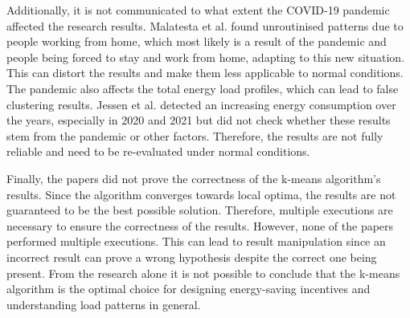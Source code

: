 Additionally, it is not communicated to what extent the COVID-19 pandemic affected the research results.
Malatesta et al. \cite{MAL-HBP} found unroutinised patterns due to people working from home, which most likely is a result of the pandemic and people being forced to stay and work from home, adapting to this new situation.
This can distort the results and make them less applicable to normal conditions.
The pandemic also affects the total energy load profiles, which can lead to false clustering results.
Jessen et al. \cite{JES-IND} detected an increasing energy consumption over the years, especially in 2020 and 2021 but did not check whether these results stem from the pandemic or other factors.
Therefore, the results are not fully reliable and need to be re-evaluated under normal conditions.

Finally, the papers did not prove the correctness of the k-means algorithm's results.
Since the algorithm converges towards local optima, the results are not guaranteed to be the best possible solution.
Therefore, multiple executions are necessary to ensure the correctness of the results.
However, none of the papers performed multiple executions.
This can lead to result manipulation since an incorrect result can prove a wrong hypothesis despite the correct one being present.
From the research alone it is not possible to conclude that the k-means algorithm is the optimal choice for designing energy-saving incentives and understanding load patterns in general.


